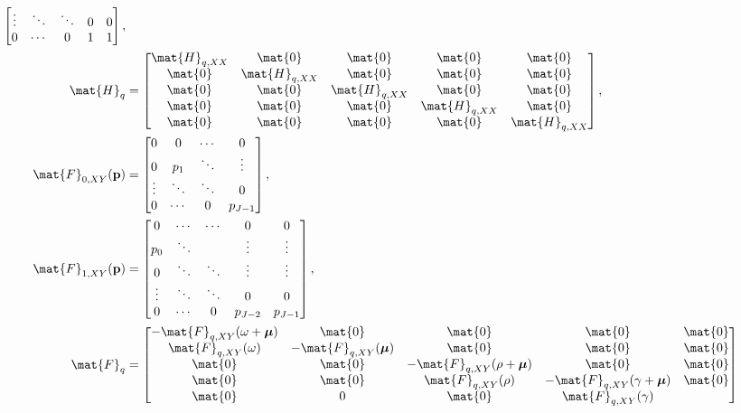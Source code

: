 \documentclass{jpmarticle}
\renewcommand{\vec}[1]{\boldsymbol{\mathrm{#1}}}
\let\subequationsorig\subequations%
\let\endsubequationsorig\endsubequations%
\renewenvironment{subequations}{
  \subequationsorig
  \renewcommand{\theequation}{\theparentequation.\arabic{equation}}
}{
  \endsubequationsorig
}
\begin{document}
\begin{subequations}
\begin{align}
\begin{bmatrix}
      \vdots & \ddots & \ddots & 0 & 0 \\
      0 & \cdots & 0 & 1 & 1
    \end{bmatrix},
    \\
    \mat{H}_{q} &=
    \begin{bmatrix}
      \mat{H}_{q, XX} & \mat{0} & \mat{0} & \mat{0} & \mat{0} \\
      \mat{0} & \mat{H}_{q, XX} & \mat{0} & \mat{0} & \mat{0} \\
      \mat{0} & \mat{0} & \mat{H}_{q, XX} & \mat{0} & \mat{0} \\
      \mat{0} & \mat{0} & \mat{0} & \mat{H}_{q, XX} & \mat{0}
      \\
      \mat{0} & \mat{0} & \mat{0} & \mat{0} & \mat{H}_{q, XX}
    \end{bmatrix},
    \\
    \mat{F}_{0, XY}(\vec{p}) &=
    \begin{bmatrix}
      0 & 0 & \cdots & 0 \\
      0 & p_1 & \ddots & \vdots \\
      \vdots & \ddots & \ddots & 0 \\
      0 & \cdots & 0 & p_{J - 1}
    \end{bmatrix},
    \\
    \mat{F}_{1, XY}(\vec{p}) &=
    \begin{bmatrix}
      0 & \cdots & \cdots & 0 & 0 \\
      p_0 & \ddots & & \vdots & \vdots \\
      0 & \ddots & \ddots & \vdots & \vdots \\
      \vdots & \ddots & \ddots & 0 & 0 \\
      0 & \cdots & 0 & p_{J - 2} & p_{J - 1}
    \end{bmatrix},
    \\
    \mat{F}_q &=
    \begin{bmatrix}
      - \mat{F}_{q, XY}(\omega + \vec{\mu}) & \mat{0} & \mat{0} & \mat{0}
      & \mat{0}
      \\
      \mat{F}_{q, XY}(\omega) & - \mat{F}_{q, XY}(\vec{\mu})
      & \mat{0} & \mat{0} & \mat{0}
      \\
      \mat{0} & \mat{0} & - \mat{F}_{q, XY}(\rho + \vec{\mu}) & \mat{0}
      & \mat{0}
      \\
      \mat{0} & \mat{0} & \mat{F}_{q, XY}(\rho)
      & - \mat{F}_{q, XY}(\gamma + \vec{\mu}) & \mat{0}
      \\
      \mat{0} & 0 & \mat{0} & \mat{F}_{q, XY}(\gamma)

\end{bmatrix}
\end{align}
\end{subequations}
\end{document}
